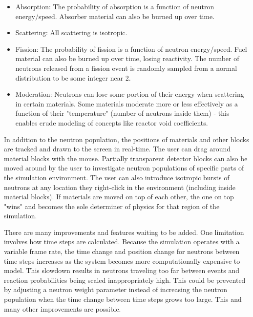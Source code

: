 \documentclass{anstrans}
\begin{document}
\begin{itemize}

    \item Absorption: The probability of absorption is a function of neutron
        energy/speed.  Absorber material can also be burned up over time.

    \item Scattering: All scattering is isotropic.

    \item Fission: The probability of fission is a function of neutron
        energy/speed.  Fuel material can also be burned up over time, losing
        reactivity.  The number of neutrons released from a fission event is
        randomly sampled from a normal distribution to be some integer near 2.

    \item Moderation: Neutrons can lose some portion of their energy when
        scattering in certain materials. Some materials moderate more or less
        effectively as a function of their "temperature" (number of neutrons
        inside them) - this enables crude modeling of concepts like reactor
        void coefficients.

\end{itemize}

In addition to the neutron population, the positions of materials and other
blocks are tracked and drawn to the screen in real-time.  The user can drag
around material blocks with the mouse.  Partially transparent detector blocks
can also be moved around by the user to investigate neutron populations of
specific parts of the simulation environment.  The user can also introduce
isotropic bursts of neutrons at any location they right-click in the
environment (including inside material blocks).  If materials are moved on top
of each other, the one on top "wins" and becomes the sole determiner of
physics for that region of the simulation.

There are many improvements and features waiting to be added.  One limitation
involves how time steps are calculated.  Because the simulation operates with
a variable frame rate, the time change and position change for neutrons
between time steps increases as the system becomes more computationally
expensive to model.  This slowdown results in neutrons traveling too far
between events and reaction probabilities being scaled inappropriately high.
This could be prevented by adjusting a neutron weight parameter instead of
increasing the neutron population when the time change between time steps
grows too large.  This and many other improvements are possible.
\end{document}
